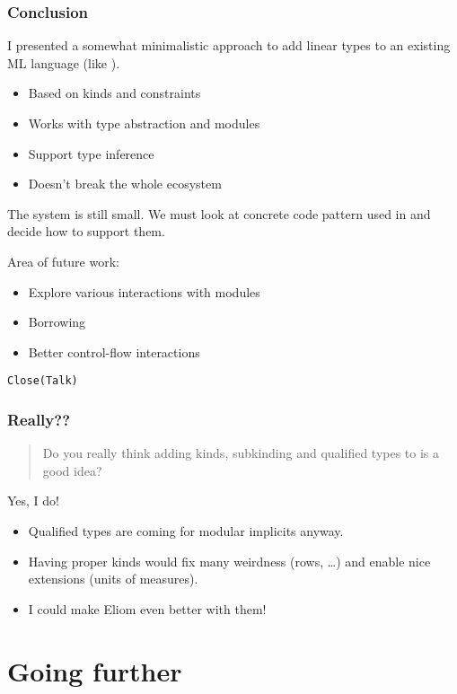 \documentclass[xcolor=svgnames,11pt]{beamer}
\begin{document}
\begin{frame}
  \frametitle{Conclusion}

  I presented a somewhat minimalistic approach to add linear types to an existing ML language (like \ocaml).

  \begin{itemize}
  \item Based on kinds and constraints
  \item Works with type abstraction and modules
  \item Support type inference
  \item Doesn't break the whole ecosystem
  \end{itemize}

  The system is still small. We must look at concrete code pattern used in \ocaml and decide how to support them.
  
  Area of future work:
  \begin{itemize}
  \item Explore various interactions with modules
  \item Borrowing
  \item Better control-flow interactions
  \end{itemize}
\end{frame}

\begin{frame}
  \Huge{\texttt{Close(Talk)}}
\end{frame}

\begin{frame}
  \frametitle{Really??}

  \begin{quote}
    Do you really think adding kinds, subkinding and qualified types to \ocaml is a good idea?
  \end{quote}\pause
  Yes, I do!\pause
  \begin{itemize}
  \item Qualified types are coming for modular implicits anyway.
  \item Having proper kinds would fix many weirdness (rows, \dots) and
    enable nice extensions (units of measures).\pause
  \item I could make Eliom even better with them! \smiley{}
  \end{itemize}
\end{frame}


\section{Going further}
\end{document}
